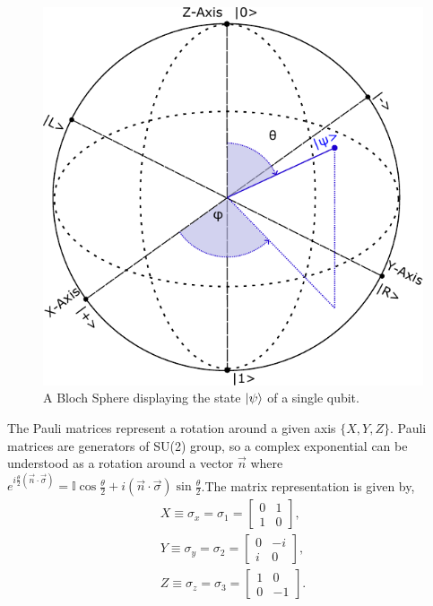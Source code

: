 \begin{figure}[H]
\centering
    \includegraphics[scale=0.8]{Figures/BlochSphere.pdf}
    \caption{A Bloch Sphere displaying the state $\ket{\psi}$ of a single qubit.}
    \label{fig:bloch_sphere}
\end{figure}
The Pauli matrices represent a rotation around a given axis $\{X, Y, Z \}$. Pauli matrices are generators of SU(2) group, so a complex exponential can be understood as a rotation around a vector $\vec{n}$ where $e^{i\frac{\theta}{2}(\vec{n}\cdot \vec{\sigma})} = \mathbb{I}\cos{\frac{\theta}{2}} + i(\vec{n}\cdot \vec{\sigma})\sin{\frac{\theta}{2}}$.The matrix representation is given by,
\begin{align*}
X \equiv \sigma_{x} = \sigma_{1} = 
    \begin{bmatrix}
           0 & 1 \\
           1 & 0 
         \end{bmatrix}, \\
Y \equiv \sigma_{y} = \sigma_{2} = 
    \begin{bmatrix}
           0 & -i \\
           i & 0 
         \end{bmatrix}, \\ 
Z \equiv \sigma_{z} = \sigma_{3} = 
    \begin{bmatrix}
           1 & 0 \\
           0 & -1 
         \end{bmatrix}.
\end{align*}
